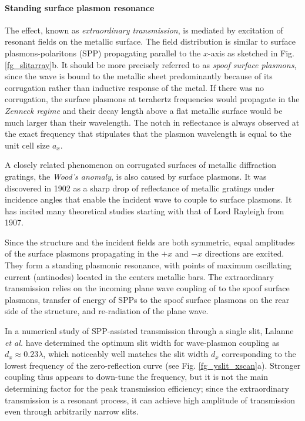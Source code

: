 \paragraph{Standing surface plasmon resonance} %
The effect, known as \textit{extraordinary transmission}, is mediated by excitation of resonant fields on the metallic surface. 
The field distribution is similar to surface plasmons-polaritons (SPP) propagating parallel to the $x$-axis as sketched in Fig. \ref{fg_slitarray}b. It should be more precisely referred to as \textit{spoof surface plasmons}, since the wave is bound to the metallic sheet predominantly because of its corrugation rather than inductive response of the metal. If there was no corrugation, the surface plasmons at terahertz frequencies would propagate in the \textit{Zenneck regime} \cite{navarro-cia2013terahertz} and their decay length above a flat metallic surface would be much larger than their wavelength. 
The notch in reflectance is always observed at the exact frequency that stipulates that the plasmon wavelength is equal to the unit cell size $a_x$.

A closely related phenomenon  on corrugated surfaces of metallic diffraction gratings, the \textit{Wood's anomaly}, is also caused by surface plasmons. It was discovered in 1902 as a sharp drop of reflectance of metallic gratings \cite{wood1902remarkable} under incidence angles that enable the incident wave to couple to surface plasmons. It has incited many theoretical studies starting with that of Lord Rayleigh \cite{rayleigh1907dynamical} from 1907.  %

Since the structure and the incident fields are both symmetric, equal amplitudes of the surface plasmons propagating in the $+x$ and $-x$ directions are excited. They form a standing plasmonic resonance, with points of maximum oscillating current (antinodes) located in the centers metallic bars. The extraordinary transmission relies on the incoming plane wave coupling of to the spoof surface plasmons, transfer of energy of SPPs to the spoof surface plasmons on the rear side of the structure, and re-radiation of the plane wave. 

In a numerical study of SPP-assisted transmission through a single slit, Lalanne \textit{et al.} have determined \cite{lalanne2005theory} the optimum slit width for wave-plasmon coupling as $d_x \approx 0.23 \lambda$, which noticeably well matches the slit width $d_x$ corresponding to the lowest frequency of the zero-reflection curve  (see Fig. \ref{fg_yslit_xscan}a). Stronger coupling thus appears to down-tune the frequency, but it is not the main determining factor for the peak transmission efficiency; since the extraordinary transmission is a resonant process, it can achieve high amplitude of transmission even through arbitrarily narrow slits. 

